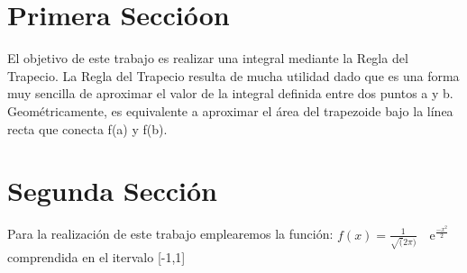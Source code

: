 

\section{Primera Seccióon}
\label{1:sec:1}
\parindent=0.5cm
\raggedright
El objetivo de este trabajo es realizar una integral mediante la Regla del Trapecio. La Regla
del Trapecio resulta de mucha utilidad dado que es una forma muy sencilla de aproximar el valor de
la integral definida entre dos puntos a y b. Geométricamente, es equivalente a aproximar el área del 
trapezoide bajo la línea recta que conecta f(a) y f(b).

\section{Segunda Sección}
\label{1:sec:2}
\parindent=0.5cm
\raggedright
Para la realización de este trabajo emplearemos la función:
$f(x)=\frac{1}{\sqrt(2\pi)} \quad\text{e}^{\frac{-x^2}{2}}$
comprendida en el itervalo [-1,1]
